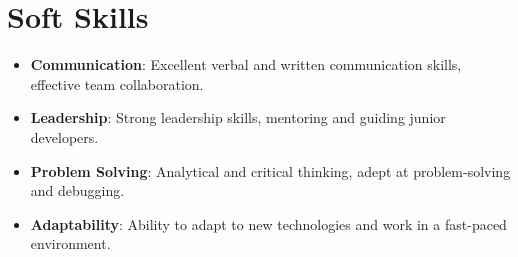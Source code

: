 \documentclass[letterpaper,1pt]{article}
\begin{document}
\vspace{-10pt}
\section{Soft Skills}
\begin{itemize}[leftmargin=*, itemsep=1pt, parsep=0pt]
  \selectfont\small
  \setlength\itemsep{0em}
  \setlength\parsep{0em}
  \item \textbf{Communication}: \hspace{0.65cm}
        Excellent verbal and written communication skills, effective team collaboration.
  \item \textbf{Leadership}: \hspace{1.45cm}
        Strong leadership skills, mentoring and guiding junior developers.
  \item \textbf{Problem Solving}: \hspace{0.45cm}
        Analytical and critical thinking, adept at problem-solving and debugging.
  \item \textbf{Adaptability}: \hspace{1.10cm}
        Ability to adapt to new technologies and work in a fast-paced environment.
\end{itemize}
\end{document}
